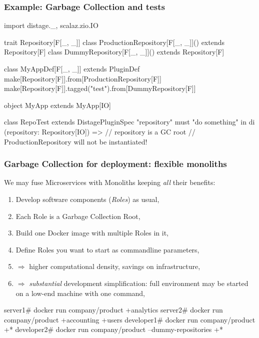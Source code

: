 \documentclass[usenames,dvipsnames]{beamer}
\begin{document}
\begin{frame}[fragile]
\frametitle{Example: Garbage Collection and tests}
  \begin{scalacode}
import distage._, scalaz.zio.IO

trait Repository[F[_, _]] {}
class ProductionRepository[F[_, _]]() extends Repository[F]
class DummyRepository[F[_, _]]() extends Repository[F]

class MyAppDef[F[_, _]] extends PluginDef {
  make[Repository[F]].from[ProductionRepository[F]]
  make[Repository[F]].tagged("test").from[DummyRepository[F]]
}

object MyApp extends MyApp[IO]

class RepoTest extends DistagePluginSpec { "repository" must {
"do something" in di {
  (repository: Repository[IO]) => // repository is a GC root
    // ProductionRepository will not be instantiated!
} } }
  \end{scalacode}
\end{frame}

\begin{frame}[fragile]
\frametitle{Garbage Collection for deployment: flexible monoliths}
  We may fuse Microservices with Monoliths keeping \textit{all} their benefits:
  \begin{enumerate}
  \item Develop software components (\textit{Roles}\footnotemark[1]) as usual\footnotemark[2],
  \item Each Role is a Garbage Collection Root,
  \item Build one Docker image with multiple Roles in it,
  \item Define Roles you want to start as commandline parameters,
  \item $\Rightarrow$ higher computational density, savings on infrastructure,
  \item $\Rightarrow$ \textit{substantial} development simplification: full environment may be started on a low-end machine with one command,
  \end{enumerate}

  \begin{textcode}
server1# docker run company/product +analytics
server2# docker run company/product +accounting +users
developer1# docker run company/product +*
developer2# docker run company/product --dummy-repositories +*
  \end{textcode}

\end{frame}
\end{document}
